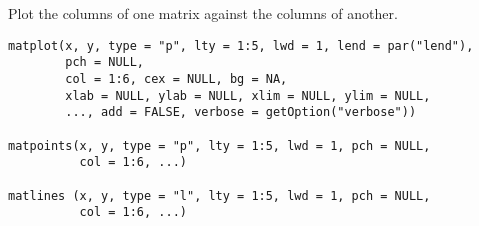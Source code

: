 %
\begin{Description}\relax
Plot the columns of one matrix against the columns of another.
\end{Description}
%
\begin{Usage}
\begin{verbatim}
matplot(x, y, type = "p", lty = 1:5, lwd = 1, lend = par("lend"),
        pch = NULL,
        col = 1:6, cex = NULL, bg = NA,
        xlab = NULL, ylab = NULL, xlim = NULL, ylim = NULL,
        ..., add = FALSE, verbose = getOption("verbose"))

matpoints(x, y, type = "p", lty = 1:5, lwd = 1, pch = NULL,
          col = 1:6, ...)

matlines (x, y, type = "l", lty = 1:5, lwd = 1, pch = NULL,
          col = 1:6, ...)
\end{verbatim}
\end{Usage}
%
